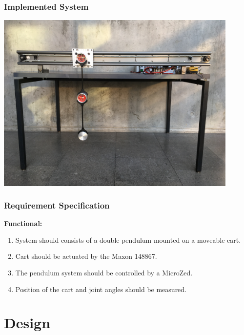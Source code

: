 \documentclass[mathserif]{beamer}
\begin{document}
\begin{frame}[c]\frametitle{Implemented System}
\centering
\includegraphics[width=0.9\textwidth]{graphics/full_system_finish}
\end{frame}

\begin{frame}[c]\frametitle{Requirement Specification}

\textbf{Functional:}
\begin{enumerate}
	\item System should consists of a double pendulum mounted on a moveable cart.\pause
	\item Cart should be actuated by the Maxon 148867. \pause
	\item The pendulum system should be controlled by a MicroZed.\pause
	\item \alert{Position of the cart and joint angles should be measured.}
\end{enumerate}

\end{frame}


\section{Design}
\end{document}

